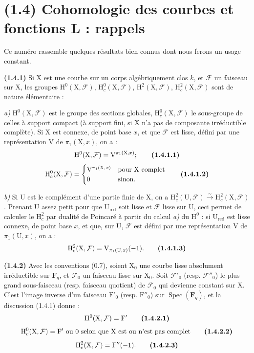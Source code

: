 \documentclass[11pt,leqno]{article}
\begin{document}
\section*{(1.4) Cohomologie des courbes et fonctions L : rappels}

Ce numéro rassemble quelques résultats bien connus dont nous ferons un usage constant.

\textbf{(1.4.1)} Si \(\mathrm{X}\) est une courbe sur un corps algébriquement clos \(k\), et \(\mathcal{F}\) un faisceau sur \(\mathrm{X}\), les groupes \(\mathrm{H}^0(\mathrm{X},\mathcal{F})\), \(\mathrm{H}_c^0(\mathrm{X},\mathcal{F})\), \(\mathrm{H}^2(\mathrm{X},\mathcal{F})\), \(\mathrm{H}_c^2(\mathrm{X},\mathcal{F})\) sont de nature élémentaire :

\textit{a)} \(\mathrm{H}^0(\mathrm{X},\mathcal{F})\) est le groupe des sections globales, \(\mathrm{H}_c^0(\mathrm{X},\mathcal{F})\) le sous-groupe de celles à support compact (à support fini, si \(\mathrm{X}\) n’a pas de composante irréductible complète). Si \(\mathrm{X}\) est connexe, de point base \(x\), et que \(\mathcal{F}\) est lisse, défini par une représentation \(\mathrm{V}\) de \(\pi_1(\mathrm{X},x)\), on a :
\[
\mathrm{H}^0(\mathrm{X},\mathcal{F})=\mathrm{V}^{\pi_1(\mathrm{X},x)};
\tag*{\textbf{(1.4.1.1)}}
\]
\[
\mathrm{H}_c^0(\mathrm{X},\mathcal{F})=
\begin{cases}
\mathrm{V}^{\pi_1(\mathrm{X},x)} & \text{pour \(\mathrm{X}\) complet}\\
0 & \text{sinon.}
\end{cases}
\tag*{\textbf{(1.4.1.2)}}
\]

\textit{b)} Si \(\mathrm{U}\) est le complément d’une partie finie de \(\mathrm{X}\), on a \(\mathrm{H}_c^2(\mathrm{U},\mathcal{F})\xrightarrow{\sim}\mathrm{H}_c^2(\mathrm{X},\mathcal{F})\). Prenant \(\mathrm{U}\) assez petit pour que \(\mathrm{U}_{\mathrm{red}}\) soit lisse et \(\mathcal{F}\) lisse sur \(\mathrm{U}\), ceci permet de calculer le \(\mathrm{H}_c^2\) par dualité de Poincaré à partir du calcul \textit{a)} du \(\mathrm{H}^0\) : si \(\mathrm{U}_{\mathrm{red}}\) est lisse connexe, de point base \(x\), et que, sur \(\mathrm{U}\), \(\mathcal{F}\) est défini par une représentation \(\mathrm{V}\) de \(\pi_1(\mathrm{U},x)\), on a :
\[
\mathrm{H}_c^2(\mathrm{X},\mathcal{F})=\mathrm{V}_{\pi_1(\mathrm{U},x)}(-1).
\tag*{\textbf{(1.4.1.3)}}
\]

\textbf{(1.4.2)} Avec les conventions (0.7), soient \(\mathrm{X}_0\) une courbe lisse absolument irréductible sur \(\mathbf{F}_q\), et \(\mathcal{F}_0\) un faisceau lisse sur \(\mathrm{X}_0\). Soit \(\mathcal{F}'_0\) (resp. \(\mathcal{F}''_0\)) le plus grand sous-faisceau (resp. faisceau quotient) de \(\mathcal{F}_0\) qui devienne constant sur \(\mathrm{X}\). C’est l’image inverse d’un faisceau \(\mathrm{F}'_0\) (resp. \(\mathrm{F}''_0\)) sur \(\operatorname{Spec}(\mathbf{F}_q)\), et la discussion (1.4.1) donne :
\[
\mathrm{H}^0(\mathrm{X},\mathcal{F})=\mathrm{F}'
\tag*{\textbf{(1.4.2.1)}}
\]
\[
\mathrm{H}_c^0(\mathrm{X},\mathcal{F})=\mathrm{F}'\text{ ou }0
\text{ selon que }\mathrm{X}\text{ est ou n’est pas complet}
\tag*{\textbf{(1.4.2.2)}}
\]
\[
\mathrm{H}_c^2(\mathrm{X},\mathcal{F})=\mathrm{F}''(-1).
\tag*{\textbf{(1.4.2.3)}}
\]
\end{document}
